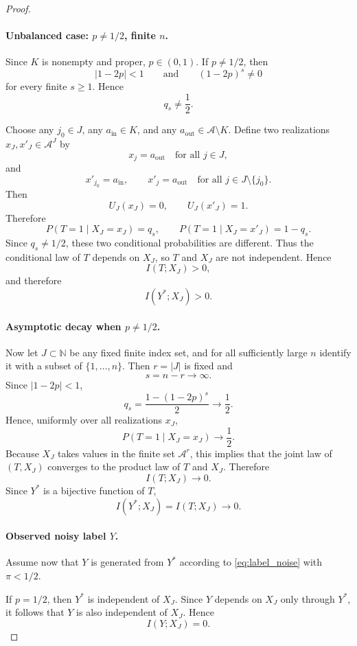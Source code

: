 \documentclass{article}
\theoremstyle{plain}
\theoremstyle{definition}
\theoremstyle{remark}
\begin{document}
\begin{proof}
\paragraph{Unbalanced case: \(p\neq 1/2\), finite \(n\).}
Since \(K\) is nonempty and proper, \(p\in(0,1)\). If \(p\neq 1/2\), then
\[
|1-2p|<1
\qquad\text{and}\qquad
(1-2p)^s \neq 0
\]
for every finite \(s\ge 1\). Hence
\[
q_s \neq \frac12.
\]

Choose any \(j_0\in J\), any \(a_{\mathrm{in}}\in K\), and any
\(a_{\mathrm{out}}\in \mathcal A\setminus K\). Define two realizations
\(x_J,x'_J\in \mathcal A^J\) by
\[
x_j = a_{\mathrm{out}} \quad \text{for all } j\in J,
\]
and
\[
x'_{j_0}=a_{\mathrm{in}},
\qquad
x'_j=a_{\mathrm{out}} \quad \text{for all } j\in J\setminus\{j_0\}.
\]
Then
\[
U_J(x_J)=0,
\qquad
U_J(x'_J)=1.
\]
Therefore
\[
P(T=1\mid X_J=x_J)=q_s,
\qquad
P(T=1\mid X_J=x'_J)=1-q_s.
\]
Since \(q_s\neq 1/2\), these two conditional probabilities are different. Thus the
conditional law of \(T\) depends on \(X_J\), so \(T\) and \(X_J\) are not independent.
Hence
\[
I(T;X_J)>0,
\]
and therefore
\[
I(Y^*;X_J)>0.
\]

\paragraph{Asymptotic decay when \(p\neq 1/2\).}
Now let \(J\subset\mathbb N\) be any fixed finite index set, and for all sufficiently large
\(n\) identify it with a subset of \(\{1,\ldots,n\}\). Then \(r=|J|\) is fixed and
\[
s=n-r \to \infty.
\]
Since \(|1-2p|<1\),
\[
q_s = \frac{1-(1-2p)^s}{2} \to \frac12.
\]
Hence, uniformly over all realizations \(x_J\),
\[
P(T=1\mid X_J=x_J)\to \frac12.
\]
Because \(X_J\) takes values in the finite set \(\mathcal A^r\), this implies that the joint
law of \((T,X_J)\) converges to the product law of \(T\) and \(X_J\). Therefore
\[
I(T;X_J)\to 0.
\]
Since \(Y^*\) is a bijective function of \(T\),
\[
I(Y^*;X_J)=I(T;X_J)\to 0.
\]

\paragraph{Observed noisy label \(Y\).}
Assume now that \(Y\) is generated from \(Y^*\) according to \eqref{eq:label_noise}
with \(\pi<1/2\).

If \(p=1/2\), then \(Y^*\) is independent of \(X_J\). Since \(Y\) depends on \(X_J\)
only through \(Y^*\), it follows that \(Y\) is also independent of \(X_J\). Hence
\[
I(Y;X_J)=0.
\]


\end{proof}
\end{document}
